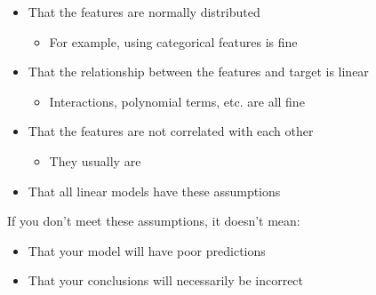 \documentclass[
  letterpaper,
]{krantz}
\providecommand{\tightlist}{%
  \setlength{\itemsep}{0pt}\setlength{\parskip}{0pt}}\usepackage{longtable,booktabs,array}
\begin{document}
\begin{itemize}
\tightlist
\item
  That the features are normally distributed

  \begin{itemize}
  \tightlist
  \item
    For example, using categorical features is fine
  \end{itemize}
\item
  That the relationship between the features and target is linear

  \begin{itemize}
  \tightlist
  \item
    Interactions, polynomial terms, etc. are all fine
  \end{itemize}
\item
  That the features are not correlated with each other

  \begin{itemize}
  \tightlist
  \item
    They usually are
  \end{itemize}
\item
  That all linear models have these assumptions
\end{itemize}

If you don't meet these assumptions, it doesn't mean:

\begin{itemize}
\tightlist
\item
  That your model will have poor predictions
\item
  That your conclusions will necessarily be incorrect
\end{itemize}
\end{document}
